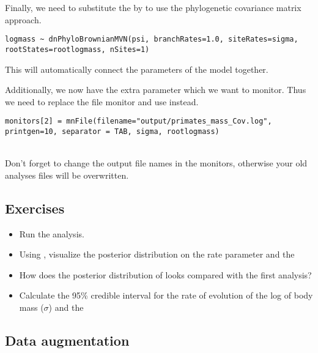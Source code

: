 Finally, we need to substitute the  by  to use the phylogenetic covariance matrix approach.
{\tt \small \begin{snugshade*}
\begin{lstlisting}
logmass ~ dnPhyloBrownianMVN(psi, branchRates=1.0, siteRates=sigma, rootStates=rootlogmass, nSites=1)
\end{lstlisting}
\end{snugshade*}}
This will automatically connect the parameters of the model together.

Additionally, we now have the extra parameter  which we want to monitor.
Thus we need to replace the file monitor and use instead.
{\tt \small \begin{snugshade*}
\begin{lstlisting}
monitors[2] = mnFile(filename="output/primates_mass_Cov.log", printgen=10, separator = TAB, sigma, rootlogmass)
\end{lstlisting}
\end{snugshade*}}


\noindent \\ \impmark Don't forget to change the output file names in the monitors, otherwise your old analyses files will be overwritten.


\subsection*{Exercises}

\begin{itemize}
\item
Run the analysis.
\item
Using , visualize the posterior distribution on the rate parameter  and the 
\item 
How does the posterior distribution of  looks compared with the first analysis?
\item
Calculate the 95\% credible interval for the rate of evolution of the log of body mass ($\sigma$) and the 
\end{itemize}

\vspace{5cm}








\subsection{Data augmentation}

